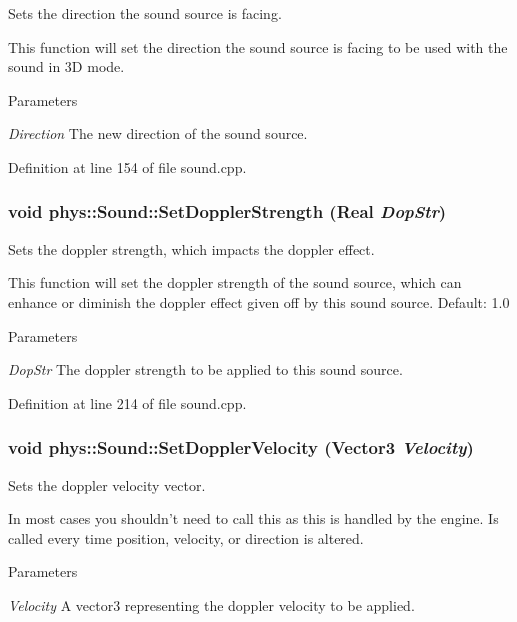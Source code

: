 Sets the direction the sound source is facing. 

This function will set the direction the sound source is facing to be used with the sound in 3D mode. 
\begin{DoxyParams}{Parameters}
\item[{\em Direction}]The new direction of the sound source. \end{DoxyParams}


Definition at line 154 of file sound.cpp.

\hypertarget{classphys_1_1Sound_a159a5ac92577b55e86a8fc2dbf8bc806}{
\subsubsection[{SetDopplerStrength}]{\setlength{\rightskip}{0pt plus 5cm}void phys::Sound::SetDopplerStrength ({\bf Real} {\em DopStr})}}
\label{dc/d2f/classphys_1_1Sound_a159a5ac92577b55e86a8fc2dbf8bc806}


Sets the doppler strength, which impacts the doppler effect. 

This function will set the doppler strength of the sound source, which can enhance or diminish the doppler effect given off by this sound source. Default: 1.0 
\begin{DoxyParams}{Parameters}
\item[{\em DopStr}]The doppler strength to be applied to this sound source. \end{DoxyParams}


Definition at line 214 of file sound.cpp.

\hypertarget{classphys_1_1Sound_a5a7f337dbc533f49269f736f51d25b85}{
\subsubsection[{SetDopplerVelocity}]{\setlength{\rightskip}{0pt plus 5cm}void phys::Sound::SetDopplerVelocity ({\bf Vector3} {\em Velocity})}}
\label{dc/d2f/classphys_1_1Sound_a5a7f337dbc533f49269f736f51d25b85}


Sets the doppler velocity vector. 

In most cases you shouldn't need to call this as this is handled by the engine. Is called every time position, velocity, or direction is altered. 
\begin{DoxyParams}{Parameters}
\item[{\em Velocity}]A vector3 representing the doppler velocity to be applied. \end{DoxyParams}



